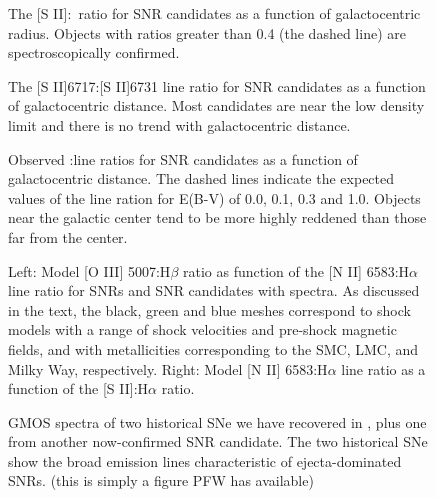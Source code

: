 \begin{figure}
\caption{The [S II]:\ha\ ratio for SNR candidates as a function of galactocentric radius.  Objects with ratios greater than 0.4 (the dashed line) are spectroscopically confirmed. \label{fig_s2_ha}}

\end{figure}

\begin{figure}
\caption{The [S II]6717:[S II]6731 line ratio for SNR candidates as a function of galactocentric distance.  Most candidates are near the low density limit and there is no trend with galactocentric distance.  \label{fig_s2_ratio}}
\end{figure}

\begin{figure}
\caption{Observed \hb:\ha line ratios for SNR candidates as a function of galactocentric distance. The dashed lines indicate the expected values of the line ration for E(B-V) of 0.0, 0.1, 0.3 and 1.0.  Objects near the galactic center tend to be more highly reddened than those far from the center. \label{fig_reddening}}
\end{figure}


\begin{figure}
\caption{Left: Model [O III] 5007:H$\beta$ ratio as function of the [N II] 6583:H$\alpha$ line ratio for SNRs and SNR candidates with spectra. As discussed in the text, the black, green and blue meshes correspond to shock models with a range of shock velocities and pre-shock magnetic fields, and with metallicities corresponding to the SMC, LMC, and Milky Way, respectively.  Right: Model [N II] 6583:H$\alpha$ line ratio as a function of  the [S II]:H$\alpha$ ratio. \label{fig_model}}
\end{figure}

\begin{figure}
\caption{GMOS spectra of two historical SNe we have recovered in \gal, plus one from another now-confirmed SNR candidate.  The two historical SNe show the broad emission lines characteristic of ejecta-dominated SNRs.  (this is simply a figure PFW has available) \label{historical_SNe}}
\end{figure}


\vspace{5mm}


